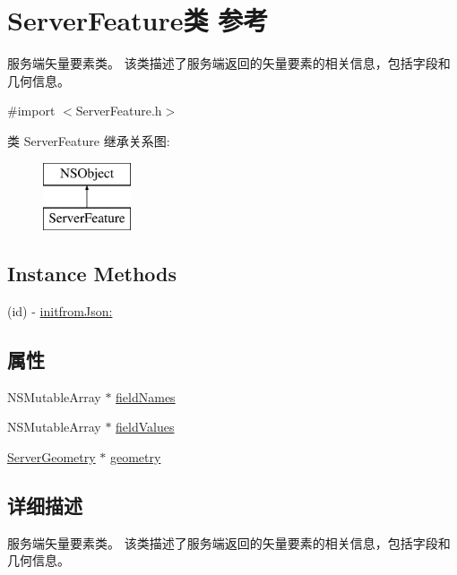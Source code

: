 \hypertarget{interface_server_feature}{\section{Server\-Feature类 参考}
\label{interface_server_feature}
}


服务端矢量要素类。 该类描述了服务端返回的矢量要素的相关信息，包括字段和几何信息。  




{\ttfamily \#import $<$Server\-Feature.\-h$>$}

类 Server\-Feature 继承关系图\-:\begin{figure}[H]
\begin{center}
\leavevmode
\includegraphics[height=2.000000cm]{interface_server_feature}
\end{center}
\end{figure}
\subsection*{Instance Methods}
\begin{DoxyCompactItemize}
\item 
(id) -\/ \hyperlink{interface_server_feature_a418921b1a839ab46b62b354035ba2968}{initfrom\-Json\-:}
\end{DoxyCompactItemize}
\subsection*{属性}
\begin{DoxyCompactItemize}
\item 
N\-S\-Mutable\-Array $\ast$ \hyperlink{interface_server_feature_a92759aee31fecc7ca7c9916cb8f5ece2}{field\-Names}
\item 
N\-S\-Mutable\-Array $\ast$ \hyperlink{interface_server_feature_a56bd6461ebce2f1d0a5516389f7c8af2}{field\-Values}
\item 
\hyperlink{interface_server_geometry}{Server\-Geometry} $\ast$ \hyperlink{interface_server_feature_a74fe7abe2c894199e12d576c3adeadea}{geometry}
\end{DoxyCompactItemize}


\subsection{详细描述}
服务端矢量要素类。 该类描述了服务端返回的矢量要素的相关信息，包括字段和几何信息。 

